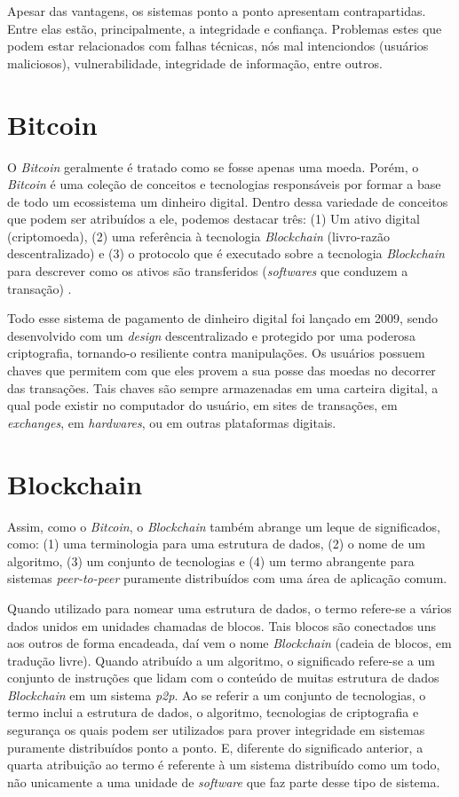 Apesar das vantagens, os sistemas ponto a ponto apresentam contrapartidas. Entre elas estão, principalmente, a integridade e confiança. Problemas estes que podem estar relacionados com falhas técnicas, nós mal intenciondos (usuários maliciosos), vulnerabilidade, integridade de informação, entre outros.
\section{Bitcoin}

O \textit{Bitcoin} geralmente é tratado como se fosse apenas uma moeda. Porém, o \textit{Bitcoin} é uma coleção de conceitos e tecnologias responsáveis por formar a base de todo um ecossistema um dinheiro digital. \cite{Antonopoulos2014} Dentro dessa variedade de conceitos que podem ser atribuídos a ele, podemos destacar três: (1) Um ativo digital (criptomoeda), (2) uma referência à tecnologia \textit{Blockchain} (livro-razão descentralizado) e (3) o protocolo que é executado sobre a tecnologia \textit{Blockchain} para descrever como os ativos são transferidos (\textit{softwares} que conduzem a transação) \cite{Swan2015}.

Todo esse sistema de pagamento de dinheiro digital foi lançado em 2009, sendo desenvolvido com um \textit{design} descentralizado e protegido por uma poderosa criptografia, tornando-o resiliente contra manipulações. \cite{Caetano2015} Os usuários possuem chaves que permitem com que eles provem a sua posse das moedas no decorrer das transações. Tais chaves são sempre armazenadas em uma carteira digital, a qual pode existir no computador do usuário, em sites de transações, em \textit{exchanges}, em \textit{hardwares}, ou em outras plataformas digitais. 

\section{Blockchain}

Assim, como o \textit{Bitcoin}, o \textit{Blockchain} também abrange um leque de significados, como: (1) uma terminologia para uma estrutura de dados, (2) o nome de um algoritmo, (3) um conjunto de tecnologias e (4) um termo abrangente para sistemas \textit{peer-to-peer} puramente distribuídos com uma área de aplicação comum.

Quando utilizado para nomear uma estrutura de dados, o termo refere-se a vários dados unidos em unidades chamadas de blocos. Tais blocos são conectados uns aos outros de forma encadeada, daí vem o nome \textit{Blockchain} (cadeia de blocos, em tradução livre). Quando atribuído a um algoritmo, o significado refere-se a um conjunto de instruções que lidam com o conteúdo de muitas estrutura de dados \textit{Blockchain} em um sistema \textit{p2p}. Ao se referir a um conjunto de tecnologias, o termo inclui a estrutura de dados, o algoritmo, tecnologias de criptografia e segurança os quais podem ser utilizados para prover integridade em sistemas puramente distribuídos ponto a ponto. E, diferente do significado anterior, a quarta atribuição ao termo é referente à um sistema distribuído como um todo, não unicamente a uma unidade de \textit{software} que faz parte desse tipo de sistema. \cite{Drescher2018}

